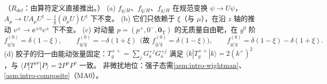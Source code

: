 \begin{proposition}\label{prop:pdf-invariance}
（$R_{\mathrm{def}}$：由算符定义直接推出。）
(a) $f_{q/H}$、$f_{\bar q/H}$、$f_{g/H}$ 在规范变换 $\psi\to U\psi$，$A_\mu\to UA_\mu U^\dagger-\frac{\ii}{g}(\partial_\mu U)U^\dagger$ 下不变。
(b) 它们只依赖于 $\xi$（与 $\mu$），在沿 $z$ 轴的推动 $v^\pm\to\ee^{\pm\eta}v^\pm$ 下不变。
(c) 对动量 $p=(p^+,0^-,\bm 0_{\mathrm T})$ 的无质量自由靶，在 $g^0$ 阶
\begin{equation}\label{eq:pdf-free}
f^{(0)}_{q/q}=\delta(1-\xi),\qquad f^{(0)}_{q/\bar q}=-\delta(1+\xi)\ \ \big(\text{故 }f^{(0)}_{\bar q/\bar q}=\delta(1-\xi)\big),\qquad
f^{(0)}_{g/g}=\delta(1-\xi)-\delta(1+\xi).
\end{equation}
(d) 胶子的归一由能动张量固定：$T^{++}_g=\sum_jG^{+j}_aG^{+j}_a$ 满足 $\langle k|T^{++}_g|k\rangle=2(k^+)^2$，与 $\langle P|T^{\mu\nu}|P\rangle=2P^\mu P^\nu$ 一致。
非微扰地位：强子态需\cref{asm:intro-wightman}、\cref{asm:intro-composite}（MA0）。
\end{proposition}

